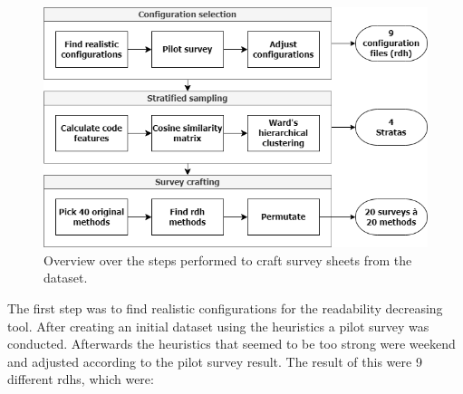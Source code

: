 \documentclass[%
class=scrreprt,
chapterprefix=false,%
open=right,%
twoside=false,%
paper=a4,%
logofile={Logo\_zentral\_farbig\_EN.png},%
thesistype=master,%
UKenglish,%
]{se2thesis}
\begin{document}
	\begin{figure}[t]
		\centering
		\includegraphics[width=\textwidth]{img/survey_pipeline.png}
		\caption{Overview over the steps performed to craft survey sheets from the dataset.}
		\label{fig:survey_pipeline}
	\end{figure}
	
	The first step was to find realistic configurations for the readability decreasing tool. After creating an initial dataset using the heuristics a pilot survey was conducted. Afterwards the heuristics that seemed to be too strong were weekend and adjusted according to the pilot survey result. The result of this were 9 different rdhs, which were:
	
\end{document}
